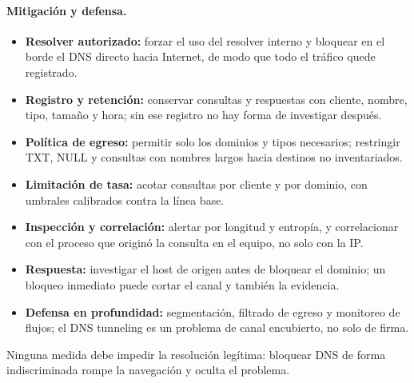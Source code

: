 \paragraph{Mitigación y defensa.}
\begin{itemize}
	\item \textbf{Resolver autorizado:} forzar el uso del resolver interno y bloquear en el borde el DNS directo hacia Internet, de modo que todo el tráfico quede registrado.
	\item \textbf{Registro y retención:} conservar consultas y respuestas con cliente, nombre, tipo, tamaño y hora; sin ese registro no hay forma de investigar después.
	\item \textbf{Política de egreso:} permitir solo los dominios y tipos necesarios; restringir TXT, NULL y consultas con nombres largos hacia destinos no inventariados.
	\item \textbf{Limitación de tasa:} acotar consultas por cliente y por dominio, con umbrales calibrados contra la línea base.
	\item \textbf{Inspección y correlación:} alertar por longitud y entropía, y correlacionar con el proceso que originó la consulta en el equipo, no solo con la IP.
	\item \textbf{Respuesta:} investigar el host de origen antes de bloquear el dominio; un bloqueo inmediato puede cortar el canal y también la evidencia.
	\item \textbf{Defensa en profundidad:} segmentación, filtrado de egreso y monitoreo de flujos; el DNS tunneling es un problema de canal encubierto, no solo de firma.
\end{itemize}
Ninguna medida debe impedir la resolución legítima: bloquear DNS de forma indiscriminada rompe la navegación y oculta el problema.

